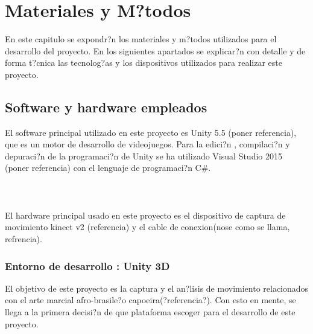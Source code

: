 %
%

\chapter{Materiales y M?todos}


\label{cap4:sec:kinect}
En este capitulo se expondr?n los  materiales  y m?todos utilizados para el desarrollo del proyecto. En los siguientes apartados se explicar?n con detalle y de forma t?cnica las tecnolog?as y los dispositivos utilizados para realizar este proyecto.

\section{Software y hardware empleados}
\label{cap4:sec:Software y hardware empleados}
El software principal utilizado en este proyecto es Unity 5.5 (poner referencia), que es un motor de desarrollo de videojuegos.
Para la edici?n , compilaci?n y depuraci?n de la programaci?n de Unity se ha utilizado Visual Studio 2015 (poner referencia) con el lenguaje de programaci?n C\#.\\
\\
\\
\\

El hardware principal usado en este proyecto es el dispositivo de captura de movimiento kinect v2 (referencia) y el cable de conexion(nose como se llama, refrencia).







\subsection{Entorno de desarrollo : Unity 3D}
\label{cap4:sec:Entorno de desarrollo : Unity 3D}
El objetivo de este proyecto es la captura y el an?lisis de movimiento relacionados con el arte marcial afro-brasile?o capoeira(?referencia?). Con esto en mente, se llega a la primera decisi?n de que plataforma escoger para el desarrollo de este proyecto.\\

